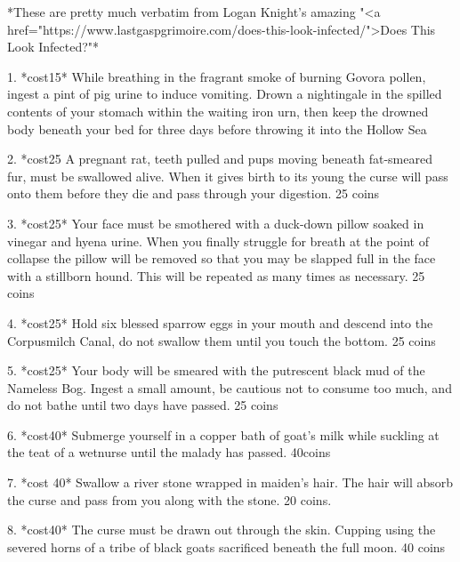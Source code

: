  








*These are pretty much verbatim from Logan Knight's amazing "<a href="https://www.lastgaspgrimoire.com/does-this-look-infected/">Does This Look Infected?"*




1. *{cost}15* While breathing in the fragrant smoke of burning Govora pollen, ingest a pint of pig urine to induce vomiting. Drown a nightingale in the spilled contents of your stomach within the waiting iron urn, then keep the drowned body beneath your bed for three days before throwing it into the Hollow Sea



2. *{cost}25 A pregnant rat, teeth pulled and pups moving beneath fat-smeared fur, must be swallowed alive. When it gives birth to its young the curse will pass onto them before they die and pass through your digestion. 25 coins



3. *{cost}25* Your face must be smothered with a duck-down pillow soaked in vinegar and hyena urine. When you finally struggle for breath at the point of collapse the pillow will be removed so that you may be slapped full in the face with a stillborn hound. This will be repeated as many times as necessary.  25 coins



4. *{cost}25* Hold six blessed sparrow eggs in your mouth and descend into the Corpusmilch Canal, do not swallow them until you touch the bottom. 25 coins



5. *{cost}25* Your body will be smeared with the putrescent black mud of the Nameless Bog. Ingest a small amount, be cautious not to consume too much, and do not bathe until two days have passed. 25 coins



6. *{cost}40* Submerge yourself in a copper bath of goat's milk while suckling at the teat of a wetnurse until the malady has passed. 40coins



7. *{cost} 40* Swallow a river stone wrapped in maiden's hair. The hair will absorb the curse and pass from you along with the stone. 20 coins.



8. *{cost}40* The curse must be drawn out through the skin. Cupping using the severed horns of a tribe of black goats sacrificed beneath the full moon. 40 coins



